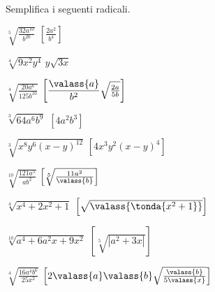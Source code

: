 \begin{esercizio}[*]
\label{ese:2.27}
Semplifica i seguenti radicali.
\vspace{-.5em}
\begin{htmulticols}{2}
\begin{enumeratea}
\item \(\sqrt[5]{\frac{32a^{10}}{b^{20}}}\)
\hfill \(\left[\frac{2 a^2}{b^4}\right]\)
\item \(\sqrt[4]{9x^2y^4}\)
\hfill \(y\sqrt{3x}\)
\item \(\sqrt[4]{\frac{20a^6}{125b^{10}}}\)
\hfill \(\left[\dfrac{\valass{a}}{b^2}\sqrt{\frac{2a}{5b}}\right]\)
\item \(\sqrt[3]{64a^6b^9}\)
\hfill \(\left[4a^2b^3\right]\)
\item \(\sqrt[3]{x^8y^6(x-y)^{12}}\)
\hfill \(\left[4x^3y^2(x-y)^{4}\right]\)
\item \(\sqrt[10]{\frac{121a^5}{ab^2}}\)
\hfill \(\left[\sqrt[5]{\frac{11a^2}{\valass{b}}}\right]\)
\item \(\sqrt[4]{x^4+2x^2+1}\)
\hfill \(\left[\sqrt{\valass{\tonda{x^2+1}}}\right]\)
\item \(\sqrt[10]{a^4+6a^2x+9x^2}\)
\hfill \(\left[\sqrt[5]{\left|a^2+3x\right|}\right]\)
\item \(\sqrt[4]{\frac{16a^4b^6}{25x^2}}\)
\hfill \(\left[2 \valass{a} \valass{b} 
         \sqrt{\frac{\valass{b}}{5 \valass{x}}}\right]\)
\end{enumeratea}
\end{htmulticols}
\end{esercizio}

